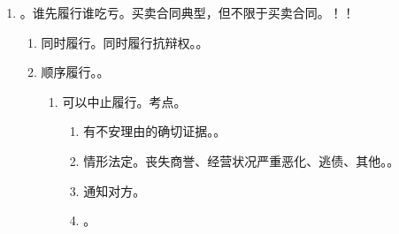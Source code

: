 \begin{enumerate}
        \begin{kk}{第三人代为履行/涤除权}
          。履行是行为，清偿是结果。
          要件。。
          新增。
          \begin{enumerate}
            \item 基于合同目的。。
            \item 基于特殊感情帮还钱。货币之债没有人身专属性，谁来履行都行。
            \item 实现对债务人的赠与。。
            \item 第三人未通知债务人。
                  \begin{enumerate}
                    \item 对债务人构成无因管理。在原债务范围内，基于无因管理进行追偿。
                    \item {}。。
                  \end{enumerate}
          \end{enumerate}
          \tcblower
          
        \end{kk}
  \item {}。谁先履行谁吃亏。买卖合同典型，但不限于买卖合同。！！
        \begin{enumerate}
          \item 同时履行。同时履行抗辩权。。
          \item 顺序履行。。
                \begin{enumerate}
                  \item {} \yjt 可以中止履行。考点。
                        \begin{enumerate}
                          \item 有不安理由的确切证据。。
                          \item 情形法定。丧失商誉、经营状况严重恶化、逃债、其他。。
                          \item 通知对方。
                          \item {}。

\end{enumerate}
\end{enumerate}
\end{enumerate}
\end{enumerate}
